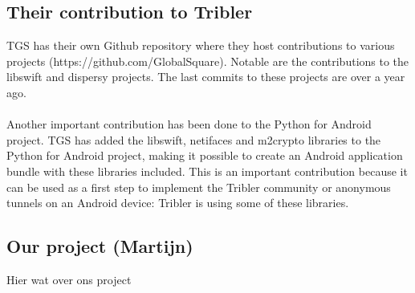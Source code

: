 \documentclass[11pt]{article}
\begin{document}
\subsection{Their contribution to Tribler}
TGS has their own Github repository where they host contributions to various projects (https://github.com/GlobalSquare). Notable are the contributions to the libswift and dispersy projects. The last commits to these projects are over a year ago.\\\\
Another important contribution has been done to the Python for Android project. TGS has added the libswift, netifaces and m2crypto libraries to the Python for Android project, making it possible to create an Android application bundle with these libraries included. This is an important contribution because it can be used as a first step to implement the Tribler community or anonymous tunnels on an Android device: Tribler is using some of these libraries.

\subsection{Our project (Martijn)}
Hier wat over ons project



\end{document}
